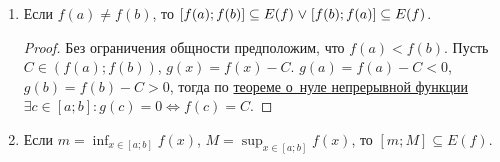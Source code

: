 \begin{enumerate}
	\item \begin{theorem}
	Если $f(a) \neq f(b)$, то $[f(a); f(b)] \subseteq E(f) \opbr\lOr [f(b); f(a)] \subseteq E(f)$.
	\end{theorem}
	\begin{proof}
	Без ограничения общности предположим, что $f(a) < f(b)$.
	Пусть $C \in (f(a); f(b))$, $g(x) = f(x) - C$.
	$g(a) = f(a) - C < 0$, $g(b) = f(b) - C > 0$, тогда по \hyperref[th:zero_of_continuous_function]{теореме о~нуле непрерывной функции} $\exists c \in [a; b] \colon g(c) = 0 \Leftrightarrow f(c) = C$.
	\end{proof}
	
	\item Если $\displaystyle m = \inf_{x \in [a; b]} f(x)$, $\displaystyle M = \sup_{x \in [a; b]} f(x)$, то $[m; M] \subseteq E(f)$.
\end{enumerate}